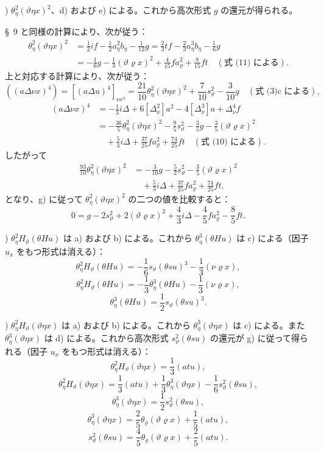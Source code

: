 \documentclass[11pt]{jlreq}
\newcommand{\A}{\Delta}
\newcommand{\R}{\varrho}
\begin{document}
) $\theta_\eta^2(\vartheta\eta x)^2$、d) および e) による。これから高次形式 $g$ の還元が得られる。

\S\ 9 と同様の計算により、次が従う：
\[
\begin{aligned}
\theta_\eta^2(\vartheta\eta x)^2
&=\frac12 i f-\frac12a_\eta^2b_\eta-\frac1{12}g
=\frac23tf-\frac23a_\eta^3b_\eta-\frac16g\\
&=-\frac16g-\frac13(\vartheta\R x)^2+\frac4{15}fa_\R^2+\frac8{15}ft
\quad(\text{式 (11) による}).
\end{aligned}
\]
上と対応する計算により、次が従う：
\[
((a\A\nu x)^4)=[(a\A u)^4]_{\nu x^4}
=\frac{21}{10}\theta_\eta^2(\vartheta\eta x)^2+\frac7{10}s_\vartheta^2-\frac3{10}g
\quad(\text{式 (3)c による}),
\]
\[
\begin{aligned}
(a\A\nu x)^4&=-\frac13i\A+6[\A_\nu^2]a^2-4[\A_\nu^3]a+\A_\nu^4f\\
&= -\frac{36}{5}\theta_\eta^2(\vartheta\eta x)^2-\frac95s_\vartheta^2-\frac35g-\frac35(\vartheta\R x)^2\\
&\quad+\frac53i\A+\frac{37}{25}fa_\R^2+\frac{74}{25}ft\quad(\text{式 (10) による}).
\end{aligned}
\]
したがって
\[
\begin{aligned}
\frac{93}{10}\theta_\eta^2(\vartheta\eta x)^2
&=-\frac3{10}g-\frac52s_\vartheta^2-\frac35(\vartheta\R x)^2\\
&\quad+\frac53i\A+\frac{37}{25}fa_\R^2+\frac{74}{25}ft,
\end{aligned}
\]
となり、g) に従って $\theta_\eta^2(\vartheta\eta x)^2$ の二つの値を比較すると：
\[
\tag{13}
0=g-2s_\vartheta^2+2(\vartheta\R x)^2+\frac43i\A-\frac45fa_\R^2-\frac85ft.
\]

) $\theta_\eta^2H_\vartheta(\theta Hu)$ は a) および b) による。これから $\theta_\eta^3(\theta Hu)$ は c) による（因子 $u_x$ をもつ形式は消える）：
\[
\theta_\eta^2H_\vartheta(\theta Hu)=-\frac16s_\vartheta(\theta su)^3-\frac13(\nu\R x),
\]
\[
\theta_\eta^2H_\vartheta(\theta Hu)=-\frac13\theta_\eta^3(\theta Hu)-\frac13(\nu\R x),
\]
\[
\theta_\eta^3(\theta Hu)=\frac12s_\vartheta(\theta su)^3.
\]

) $\theta_\eta^2H_\vartheta(\vartheta\eta x)$ は a) および b) による。これから $\theta_\eta^3(\vartheta\eta x)$ は c) による。また $\theta_\eta^3(\vartheta\eta x)$ は d) による。これから高次形式 $s_\vartheta^2(\theta su)$ の還元が g) に従って得られる（因子 $u_x$ をもつ形式は消える）：
\[
\theta_\eta^2H_\vartheta(\vartheta\eta x)=\frac13(atu),
\]
\[
\theta_\eta^2H_\vartheta(\vartheta\eta x)=\frac13(atu)+\frac13\theta_\eta^3(\vartheta\eta x)-\frac16s_\vartheta^2(\theta su),
\]
\[
\theta_\eta^3(\vartheta\eta x)=\frac12s_\vartheta^2(\theta su),
\]
\[
\theta_\eta^3(\vartheta\eta x)=\frac25\theta_\R(\vartheta\R x)+\frac15(atu),
\]
\[
\tag{14}
s_\vartheta^2(\theta su)=\frac45\theta_\R(\vartheta\R x)+\frac25(atu).
\]
\end{document}

